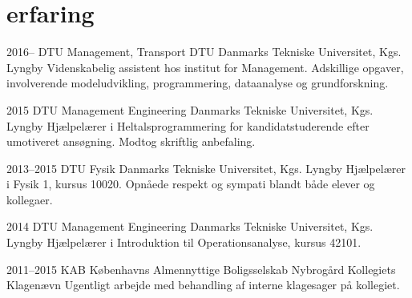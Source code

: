 \documentclass[]{friggeri-cv} %
\begin{document}
\section{erfaring}
\begin{entrylist}
\entry
{2016--}
{DTU Management, Transport DTU}
{Danmarks Tekniske Universitet, Kgs. Lyngby}
{Videnskabelig assistent hos institut for Management. Adskillige opgaver, involverende modeludvikling, programmering, dataanalyse og grundforskning.}

\entry
{2015}
{DTU Management Engineering}
{Danmarks Tekniske Universitet, Kgs. Lyngby}
{Hjælpelærer i Heltalsprogrammering for kandidatstuderende efter umotiveret ansøgning. Modtog  skriftlig anbefaling.}

\entry
{2013--2015}
{DTU Fysik}
{Danmarks Tekniske Universitet, Kgs. Lyngby}
{Hjælpelærer i Fysik 1, kursus 10020. Opnåede  respekt og sympati blandt både elever og kollegaer.}

\entry
{2014}
{DTU Management Engineering}
{Danmarks Tekniske Universitet, Kgs. Lyngby}
{Hjælpelærer i Introduktion til Operationsanalyse, kursus 42101.}

\entry
{2011--2015}
{KAB {\normalfont Københavns Almennyttige Boligsselskab}}
{Nybrogård Kollegiets Klagenævn}
{Ugentligt arbejde med behandling af interne klagesager på kollegiet.
}
\end{entrylist}


\end{document}
